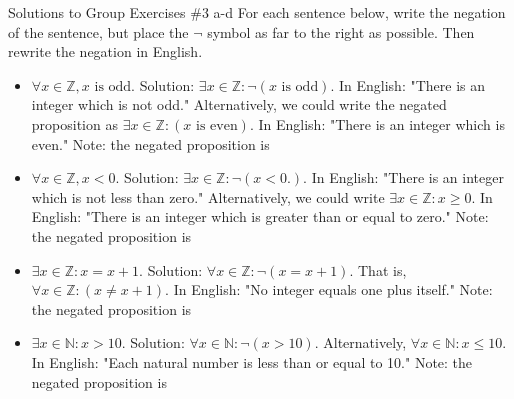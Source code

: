 \documentclass[10pt]{beamer}
\begin{document}
\begin{frame}{Solutions to Group Exercises \#3 a-d}
\small 
For each sentence below, write the negation of the sentence, but place the $\lnot$ symbol as far to the right as possible. Then rewrite the negation in English.  
    \begin{itemize}    
        \item[a.] $\forall x \in \mathbb{Z}, x \text{ is odd.} $   \alert{Solution: $\exists x \in \mathbb{Z}: \lnot (x \text{ is odd})$.  In English: "There is an integer which is not odd." Alternatively, we could write the negated proposition as $\exists x \in \mathbb{Z}: (x \text{ is even})$.  In English: "There is an integer which is even."  Note: the negated proposition is}\, 
        \item[b.] $\forall x \in \mathbb{Z}, x<0.$  \alert{Solution: $\exists x \in \mathbb{Z}: \lnot (x<0.)$.   In English: "There is an integer which is not less than zero."  Alternatively, we could write $\exists x \in \mathbb{Z}: x \geq 0$. In English: "There is an integer which is greater than or equal to zero."   Note: the negated proposition is}\, 
        \item[c.] $\exists x \in \mathbb{Z}: x=x+1.$  \alert{Solution: $\forall x \in \mathbb{Z}: \lnot (x=x+1)$. That is, $\forall x \in \mathbb{Z}: (x \neq x+1)$. In English: "No integer equals one plus itself." Note: the negated proposition is}\, 
        \item[d.] $\exists x \in \mathbb{N}: x>10.$  \alert{Solution: $\forall x \in \mathbb{N}: \lnot (x>10)$. Alternatively, $\forall x \in \mathbb{N}: x \leq 10.$ In English: "Each natural number is less than or equal to 10."  Note: the negated proposition is}\,  
        \end{itemize}
\end{frame}
\end{document}
